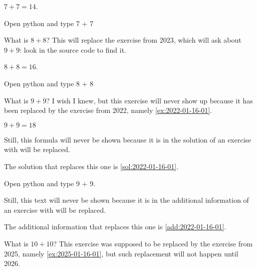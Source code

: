 \documentclass[oneside]{book}
\begin{document}
\begin{solution}
  \(7 + 7 = 14\).
\end{solution}

\begin{additionalinformation}
Open python and type 7 + 7
\end{additionalinformation}

\begin{exercise}[examdate={January 16, 2022}, examproblemnumber={1}, examproblemid={2022-01-16-01}]
  What is \(8 + 8\)? This will replace the exercise from 2023, which will ask about \(9 + 9\): look in the source code to find it.
\end{exercise}

\begin{solution}
  \(8 + 8 = 16\).
\end{solution}

\begin{additionalinformation}
Open python and type 8 + 8
\end{additionalinformation}

\begin{exercise}[examdate={January 16, 2023}, examproblemnumber={1}, examproblemid={2023-01-16-01}, replacedbyexamproblemid={2022-01-16-01}, replacementsinceacademicyear={2025/2026}]
  What is \(9 + 9\)? I wish I knew, but this exercise will never show up because it has been replaced by the exercise from 2022, namely \cref{ex:2022-01-16-01}.
\end{exercise}

\begin{solution}
  \(9 + 9 = 18\)

Still, this formula will never be shown because it is in the solution of an exercise with will be replaced.

The solution that replaces this one is \cref{sol:2022-01-16-01}.
\end{solution}

\begin{additionalinformation}
Open python and type 9 + 9.

Still, this text will never be shown because it is in the additional information of an exercise with will be replaced.

The additional information that replaces this one is \cref{add:2022-01-16-01}.
\end{additionalinformation}

\begin{exercise}[examdate={January 16, 2024}, examproblemnumber={1}, examproblemid={2024-01-16-01}, replacedbyexamproblemid={2023-01-16-01}, replacementsinceacademicyear={2026/2027}]
  What is \(10 + 10\)? This exercise was supposed to be replaced by the exercise from 2025, namely \cref{ex:2025-01-16-01}, but such replacement will not happen until 2026.
\end{exercise}
\end{document}
